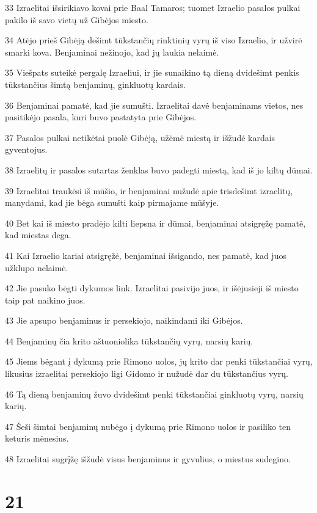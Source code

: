 \par 33 Izraelitai išsirikiavo kovai prie Baal Tamaros; tuomet Izraelio pasalos pulkai pakilo iš savo vietų už Gibėjos miesto. 
\par 34 Atėjo prieš Gibėją dešimt tūkstančių rinktinių vyrų iš viso Izraelio, ir užvirė smarki kova. Benjaminai nežinojo, kad jų laukia nelaimė. 
\par 35 Viešpats suteikė pergalę Izraeliui, ir jie sunaikino tą dieną dvidešimt penkis tūkstančius šimtą benjaminų, ginkluotų kardais. 
\par 36 Benjaminai pamatė, kad jie sumušti. Izraelitai davė benjaminams vietos, nes pasitikėjo pasala, kuri buvo pastatyta prie Gibėjos. 
\par 37 Pasalos pulkai netikėtai puolė Gibėją, užėmė miestą ir išžudė kardais gyventojus. 
\par 38 Izraelitų ir pasalos sutartas ženklas buvo padegti miestą, kad iš jo kiltų dūmai. 
\par 39 Izraelitai traukėsi iš mūšio, ir benjaminai nužudė apie trisdešimt izraelitų, manydami, kad jie bėga sumušti kaip pirmajame mūšyje. 
\par 40 Bet kai iš miesto pradėjo kilti liepsna ir dūmai, benjaminai atsigręžę pamatė, kad miestas dega. 
\par 41 Kai Izraelio kariai atsigręžė, benjaminai išsigando, nes pamatė, kad juos užklupo nelaimė. 
\par 42 Jie pasuko bėgti dykumos link. Izraelitai pasivijo juos, ir išėjusieji iš miesto taip pat naikino juos. 
\par 43 Jie apsupo benjaminus ir persekiojo, naikindami iki Gibėjos. 
\par 44 Benjaminų čia krito aštuoniolika tūkstančių vyrų, narsių karių. 
\par 45 Jiems bėgant į dykumą prie Rimono uolos, jų krito dar penki tūkstančiai vyrų, likusius izraelitai persekiojo ligi Gidomo ir nužudė dar du tūkstančius vyrų. 
\par 46 Tą dieną benjaminų žuvo dvidešimt penki tūkstančiai ginkluotų vyrų, narsių karių. 
\par 47 Šeši šimtai benjaminų nubėgo į dykumą prie Rimono uolos ir pasiliko ten keturis mėnesius. 
\par 48 Izraelitai sugrįžę išžudė visus benjaminus ir gyvulius, o miestus sudegino.



\chapter{21}

